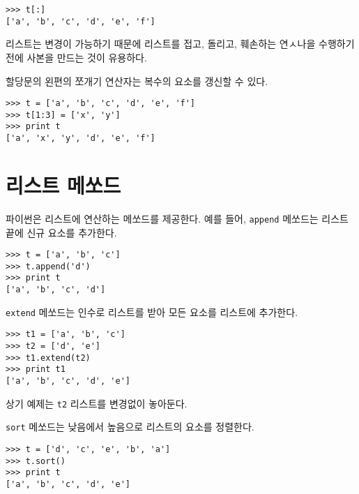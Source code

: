 
\beforeverb
\begin{verbatim}
>>> t[:]
['a', 'b', 'c', 'd', 'e', 'f']
\end{verbatim}
\afterverb
%

리스트는 변경이 가능하기 때문에 리스트를 접고, 돌리고, 훼손하는 연ㅅ나을 수행하기 전에 사본을 만드는 것이 유용하다.


할당문의 왼편의 쪼개기 연산자는 복수의 요소를 갱신할 수 있다.


\beforeverb
\begin{verbatim}
>>> t = ['a', 'b', 'c', 'd', 'e', 'f']
>>> t[1:3] = ['x', 'y']
>>> print t
['a', 'x', 'y', 'd', 'e', 'f']
\end{verbatim}
\afterverb
%

\section{리스트 메쏘드}


파이썬은 리스트에 연산하는 메쏘드를 제공한다. 예를 들어, {\tt append} 메쏘드는 리스트 끝에 신규 요소를 추가한다.


\beforeverb
\begin{verbatim}
>>> t = ['a', 'b', 'c']
>>> t.append('d')
>>> print t
['a', 'b', 'c', 'd']
\end{verbatim}
\afterverb
%
{\tt extend} 메쏘드는 인수로 리스트를 받아 모든 요소를 리스트에 추가한다.


\beforeverb
\begin{verbatim}
>>> t1 = ['a', 'b', 'c']
>>> t2 = ['d', 'e']
>>> t1.extend(t2)
>>> print t1
['a', 'b', 'c', 'd', 'e']
\end{verbatim}
\afterverb
%

상기 예제는 {\tt t2} 리스트를 변경없이 놓아둔다.

{\tt sort} 메쏘드는 낮음에서 높음으로 리스트의 요소를 정렬한다.


\beforeverb
\begin{verbatim}
>>> t = ['d', 'c', 'e', 'b', 'a']
>>> t.sort()
>>> print t
['a', 'b', 'c', 'd', 'e']
\end{verbatim}
\afterverb
%

